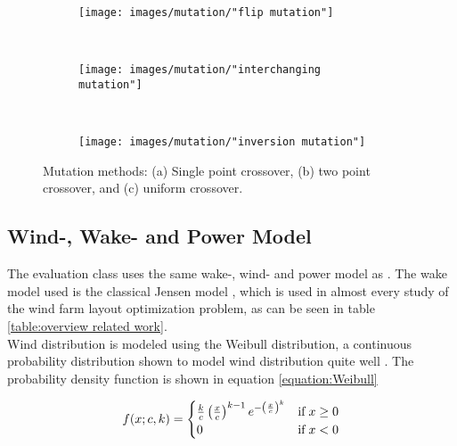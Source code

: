 \begin{figure}[h!]
    \centering
    \begin{subfigure}[b]{0.3\textwidth}
        \texttt{[image: images/mutation/"flip mutation"]}
        \caption{}
        \label{figure:flip mutation}
    \end{subfigure}
    ~ 
    \begin{subfigure}[b]{0.3\textwidth}
        \texttt{[image: images/mutation/"interchanging mutation"]}
        \caption{}
        \label{figure:interchange mutation}
    \end{subfigure}
    ~
    \begin{subfigure}[b]{0.3\textwidth}
        \texttt{[image: images/mutation/"inversion mutation"]}
        \caption{}
        \label{figure:inversion mutation}
    \end{subfigure}
    \caption{Mutation methods: (a) Single point crossover, (b) two point crossover, and (c) uniform crossover.}
    \label{figure:mutation methods}
\end{figure}


\subsection{Wind-, Wake- and Power Model}\label{subsection:wind-, wake- and power model}
The evaluation class uses the same wake-, wind- and power model as \cite{Kusiak}. The wake model used is the classical Jensen model \citep{Jensen}, which is used in almost every study of the wind farm layout optimization problem, as can be seen in table \ref{table:overview related work}. \\

\noindent Wind distribution is modeled using the Weibull distribution, a continuous probability distribution shown to model wind distribution quite well \citep{Justus}. The probability density function is shown in equation \ref{equation:Weibull}


\begin{equation}
f(x; c, k)  = 
\begin{cases}
\frac{k}{c} \left( \frac{x}{c} \right)^{k-1} e^{- \left( \frac{x}{c} \right)^k } & \text{if} \hspace{1mm} x \geq 0 \\
0                                                                                                                      & \text{if} \hspace{1mm}     x < 0
\end{cases}
\label{equation:Weibull}
\end{equation}


